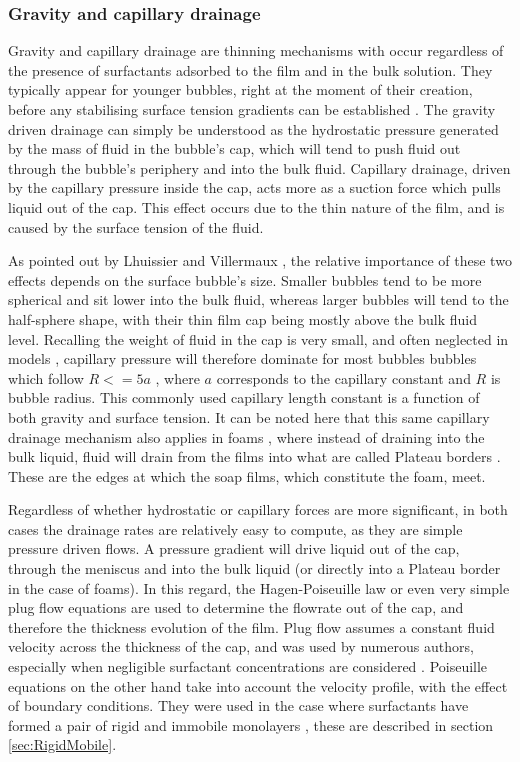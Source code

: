 \documentclass[a4paper,12pt]{article}
\numberwithin{equation}{section}
\numberwithin{figure}{section}
\numberwithin{table}{section}
\begin{document}
\subsubsection{Gravity and capillary drainage}
\label{sec:GravNCap}
Gravity and capillary drainage are thinning mechanisms with occur regardless of the presence of surfactants adsorbed to the film and in the bulk solution. They typically appear for younger bubbles, right at the moment of their creation, before any stabilising surface tension gradients can be established \cite{Lhuissier2011}. The gravity driven drainage can simply be understood as the hydrostatic pressure generated by the mass of fluid in the bubble's cap, which will tend to push fluid out through the bubble's periphery and into the bulk fluid. Capillary drainage, driven by the capillary pressure inside the cap, acts more as a suction force which pulls liquid out of the cap. This effect occurs due to the thin nature of the film, and is caused by the surface tension of the fluid.

As pointed out by Lhuissier and Villermaux \cite{Lhuissier2011}, the relative importance of these two effects depends on the surface bubble's size. Smaller bubbles tend to be more spherical and sit lower into the bulk fluid, whereas larger bubbles will tend to the half-sphere shape, with their thin film cap being mostly above the bulk fluid level. Recalling the weight of fluid in the cap is very small, and often neglected in models \cite{Ida1998}, capillary pressure will therefore dominate for most bubbles bubbles which follow $R <= 5a$ \cite{Lhuissier2011}, where $a$ corresponds to the capillary constant and $R$ is bubble radius. This commonly used capillary length constant is a function of both gravity and surface tension. It can be noted here that this same capillary drainage mechanism also applies in foams \cite{Braun2002}, where instead of draining into the bulk liquid, fluid will drain from the films into what are called Plateau borders \cite{Almgren1976}. These are the edges at which the soap films, which constitute the foam, meet.

Regardless of whether hydrostatic or capillary forces are more significant, in both cases the drainage rates are relatively easy to compute, as they are simple pressure driven flows. A pressure gradient will drive liquid out of the cap, through the meniscus and into the bulk liquid (or directly into a Plateau border in the case of foams). In this regard, the Hagen-Poiseuille law or even very simple plug flow equations are used to determine the flowrate out of the cap, and therefore the thickness evolution of the film. Plug flow assumes a constant fluid velocity across the thickness of the cap, and was used by numerous authors, especially when negligible surfactant concentrations are considered \cite{Debregeas1998, Lhuissier2011, Breward2002, ChampougnyNotBare2016}. Poiseuille equations on the other hand take into account the velocity profile, with the effect of boundary conditions. They were used in the case where surfactants have formed a pair of rigid and immobile monolayers \cite{Nierstrasz1999, Bruinsma1995, Modini2013}, these are described in section \ref{sec:RigidMobile}.
\end{document}
